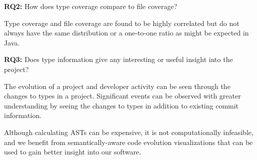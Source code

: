 \textbf{RQ2:} How does type coverage compare to file coverage?

\begin{framed}
\noindent
Type coverage and file coverage are found to be highly correlated but do not always have the same distribution or a one-to-one ratio as might be expected in Java.
\end{framed}

\textbf{RQ3:} Does type information give any interesting or useful insight into the project?

\begin{framed}
\noindent
The evolution of a project and developer activity can be seen through the changes to types in a project. Significant events can be observed with greater understanding by seeing the changes to types in addition to existing commit information.
\end{framed}

Although calculating ASTs can be expensive, it is not computationally infeasible, and we benefit from semantically-aware code evolution visualizations that can be used to gain better insight into our software.




